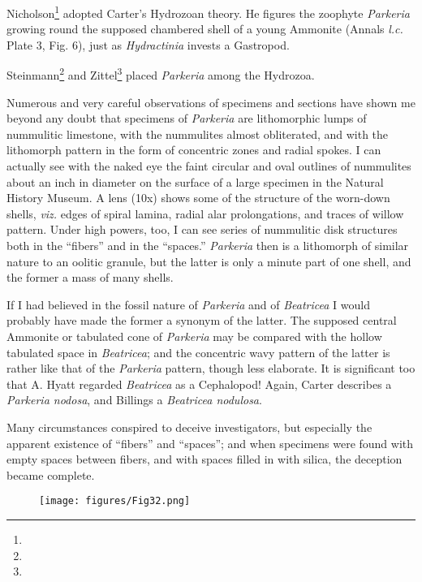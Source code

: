 \documentclass[a4paper, 12pt, oneside]{article}
\begin{document}
Nicholson\footnote{} adopted Carter's Hydrozoan theory. He figures the zoophyte \emph{Parkeria} growing round the supposed chambered shell of a young Ammonite (Annals \emph{l.c.} Plate 3, Fig. 6), just as \emph{Hydractinia} invests a Gastropod.

Steinmann\footnote{} and Zittel\footnote{} placed \emph{Parkeria} among the Hydrozoa.

Numerous and very careful observations of specimens and sections have shown me beyond any doubt that specimens of \emph{Parkeria} are lithomorphic lumps of nummulitic limestone, with the nummulites almost obliterated, and with the lithomorph pattern in the form of concentric zones and radial spokes. I can actually see with the naked eye the faint circular and oval outlines of nummulites about an inch in diameter on the surface of a large specimen in the Natural History Museum. A lens (10x) shows some of the structure of the worn-down shells, \emph{viz.} edges of spiral lamina, radial alar prolongations, and traces of willow pattern. Under high powers, too, I can see series of nummulitic disk structures both in the ``fibers'' and in the ``spaces.'' \emph{Parkeria} then is a lithomorph of similar nature to an oolitic granule, but the latter is only a minute part of one shell, and the former a mass of many shells.

If I had believed in the fossil nature of \emph{Parkeria} and of \emph{Beatricea} I would probably have made the former a synonym of the latter. The supposed central Ammonite or tabulated cone of \emph{Parkeria} may be compared with the hollow tabulated space in \emph{Beatricea}; and the concentric wavy pattern of the latter is rather like that of the \emph{Parkeria} pattern, though less elaborate. It is significant too that A. Hyatt regarded \emph{Beatricea} as a Cephalopod! Again, Carter describes a \emph{Parkeria nodosa}, and Billings a \emph{Beatricea nodulosa}.

Many circumstances conspired to deceive investigators, but especially the apparent existence of ``fibers'' and ``spaces''; and when specimens were found with empty spaces between fibers, and with spaces filled in with silica, the deception became complete.
\begin{figure}[H]
\centering
\texttt{[image: figures/Fig32.png]}
\caption*{}
\end{figure}
\end{document}
